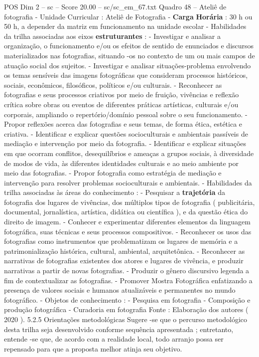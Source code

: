 \begin{textsample}{POS Dim 2 – sc – Score 20.00 – sc/sc\_em\_67.txt}
Quadro 48 – Ateliê de fotografia - Unidade Curricular : Ateliê de Fotografia - \textbf{Carga} \textbf{Horária} : 30 h ou 50 h, a depender da matriz em funcionamento na unidade escolar - Habilidades da trilha associadas aos eixos \textbf{estruturantes} : - Investigar e analisar a organização, o funcionamento e/ou os efeitos de sentido de enunciados e discursos materializados nas fotografias, situando -os no contexto de um ou mais campos de atuação social dos sujeitos. - Investigar e analisar situações-problema envolvendo os temas sensíveis das imagens fotográficas que consideram processos históricos, sociais, econômicos, filosóficos, políticos e/ou culturais. - Reconhecer as fotografias e seus processos criativos por meio de fruição, vivências e reflexão crítica sobre obras ou eventos de diferentes práticas artísticas, culturais e/ou corporais, ampliando o repertório/domínio pessoal sobre o seu funcionamento. - Propor reflexões acerca das fotografias e seus temas, de forma ética, estética e criativa. - Identificar e explicar questões socioculturais e ambientais passíveis de mediação e intervenção por meio da fotografia. - Identificar e explicar situações em que ocorram conflitos, desequilíbrios e ameaças a grupos sociais, à diversidade de modos de vida, às diferentes identidades culturais e ao meio ambiente por meio das fotografias. - Propor fotografia como estratégia de mediação e intervenção para resolver problemas socioculturais e ambientais. - Habilidades da trilha associadas às áreas do conhecimento : - Pesquisar a \textbf{trajetória} da fotografia dos lugares de vivências, dos múltiplos tipos de fotografia ( publicitária, documental, jornalística, artística, didática ou científica ), e da questão ética do direito de imagem. - Conhecer e experimentar diferentes elementos da linguagem fotográfica, suas técnicas e seus processos compositivos. - Reconhecer os usos das fotografias como instrumentos que problematizam os lugares de memória e a patrimonialização histórica, cultural, ambiental, arquitetônica. - Reconhecer as narrativas de fotografias existentes dos atores e lugares de vivência, e produzir narrativas a partir de novas fotografias. - Produzir o gênero discursivo legenda a fim de contextualizar as fotografias. - Promover Mostra Fotográfica enfatizando a presença de valores sociais e humanos atualizáveis e permanentes no mundo fotográfico. - Objetos de conhecimento : - Pesquisa em fotografia - Composição e produção fotográfica - Curadoria em fotografia Fonte : Elaboração dos autores ( 2020 ). 5.2.5 Orientações metodológicas Sugere -se que o percurso metodológico desta trilha seja desenvolvido conforme sequência apresentada ; entretanto, entende -se que, de acordo com a realidade local, todo arranjo possa ser repensado para que a proposta melhor atinja seu objetivo.

\end{textsample}
